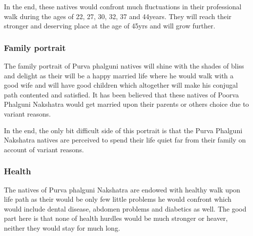 \documentclass[12pt, right open]{memoir}
\begin{document}
In the end, these natives would confront much fluctuations in their professional walk during the ages of 22, 27, 30, 32, 37 and 44years. They will reach their stronger and deserving place at the age of 45yrs and will grow further.

\subsubsection{Family portrait}

The family portrait of Purva  phalguni natives will shine with the shades of bliss and delight as their will be a happy married life where he would walk with a good wife and will have good children which altogether will make his conjugal path contented and satisfied. It has been believed that these natives of Poorva Phalguni Nakshatra would get married upon their parents or others choice due to variant reasons.

In the end, the only bit difficult side of this portrait is that the Purva Phalguni Nakshatra natives are perceived to spend their life quiet far from their family on account of variant reasons.

\subsubsection{Health}

The natives of Purva phalguni Nakshatra are endowed with healthy walk upon life path as their would be only few little problems he would confront which would include dental disease, abdomen problems and diabetics as well. The good part here is that none of health hurdles would be much stronger or heaver, neither they would stay for much long.
\end{document}
